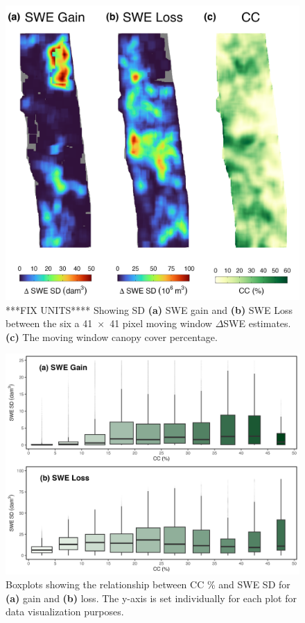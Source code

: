 \clearpage
\begin{figure}[t]
\centering
\includegraphics[width=\textwidth]{figures/ch4_figs/sd_vs_cc_map_dam3_41x41.png}
\caption{***FIX UNITS**** Showing SD \textbf{(a)} SWE gain and \textbf{(b)} SWE Loss between the six a 41~$\times$~41 pixel moving window $\Delta$SWE estimates. \textbf{(c)} The moving window canopy cover percentage.}
\label{fig:dswe_standard_deviation}
\end{figure}

\clearpage
\begin{figure}[t]
\centering
\includegraphics[width=\textwidth]{figures/ch4_figs/swe_sd_bp_dam3_41x41_v1.png}
\caption{Boxplots showing the relationship between CC \% and SWE SD for \textbf{(a)} gain and \textbf{(b)} loss. The y-axis is set individually for each plot for data visualization purposes.}
\label{fig:dswe_boxplots}
\end{figure}






